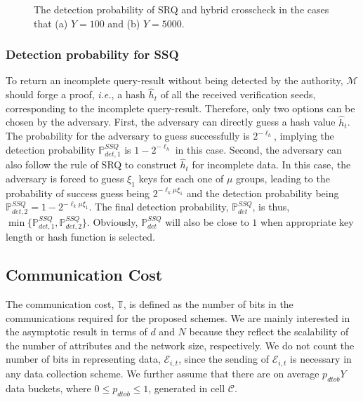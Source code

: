 \documentclass[conference]{IEEEtran}
\begin{document}
\begin{figure}[h]
\centering
{}
\caption{\scriptsize The detection probability of SRQ and hybrid crosscheck in the cases that (a) $Y=100$ and (b) $Y=5000$.} \label{fig: detection probability}
\end{figure}

\subsubsection{Detection probability for SSQ}\label{sec: Detection probability of SSQ}
To return an incomplete query-result without being detected by the authority, $\mathcal{M}$ should forge a proof, \emph{i.e.}, a hash $\widehat{h}_t$ of all the received verification seeds, corresponding to the incomplete query-result. Therefore, only two options can be chosen by the adversary. First, the adversary can directly guess a hash value $\widehat{h}_t$. The probability for the adversary to guess successfully is $2^{-\ell_h}$, implying the detection probability $\mathbb{P}_{det,1}^{SSQ}$ is $1-2^{-\ell_h}$ in this case. Second, the adversary can also follow the rule of SRQ to construct $\widehat{h}_t$ for incomplete data. In this case, the adversary is forced to guess $\xi_1$ keys for each one of $\mu$ groups, leading to the probability of success guess being $2^{-\ell_k \mu \xi_1}$ and the detection probability being $\mathbb{P}_{det,2}^{SSQ}=1-2^{-\ell_k \mu \xi_1}$. The final detection probability, $\mathbb{P}_{det}^{SSQ}$, is thus, $\min\{\mathbb{P}_{det,1}^{SSQ},\mathbb{P}_{det,2}^{SSQ}\}$. Obviously, $\mathbb{P}_{det}^{SSQ}$ will also be close to $1$ when appropriate key length or hash function is selected.

\subsection{Communication Cost}\label{sec: Communication Cost}
The communication cost, $\mathbb{T}$, is defined as the number of bits in the communications required for the proposed schemes. We are mainly interested in the asymptotic result in terms of $d$ and $N$ because they reflect the scalability of the number of attributes and the network size, respectively. We do not count the number of bits in representing data, $\mathcal{E}_{i,t}$, since the sending of $\mathcal{E}_{i,t}$ is necessary in any data collection scheme. We further assume that there are on average $p_{dtob}Y$ data buckets, where $0\leq p_{dtob}\leq 1$, generated in cell $\mathcal{C}$.
\end{document}
